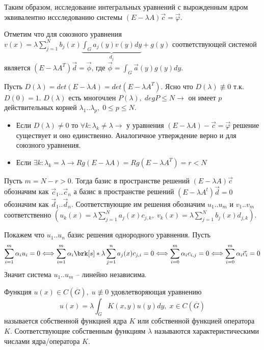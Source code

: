 Таким образом, исследование интегральных уравнений с вырожденным ядром эквивалентно иссследованию системы $(E -\lambda A)\vec{c} = \vec{\varphi}$.

\begin{offtop}
Отметим что для союзного уравнения $v(x) = \lambda \sum_{j = 1}^{N}b_{j}(x)\underbrace{\int_{G}a_{j}(y)v(y)dy}_{d_{j}} + g(y)$ соответствующей системой является $(E - \lambda A^{T})\vec{d}=\vec{\phi}$, где $\vec{\phi}=\int_{G}\vec{a}(y)g(y)dy$.
\end{offtop}

Пусть $D(\lambda) = det(E - \lambda A) = det(E - \lambda A^{T})$. Ясно что $D(\lambda) \not\equiv 0$ т.к. $D(0) = 1$. $D(\lambda)$ есть многочлен $P(\lambda), \; degP \leq N \longrightarrow$ он имеет $p$ действительных корней $\lambda_{1}..\lambda_{p},\; 0 \leq p \leq N$.
\begin{itemize}
  \item Если $D(\lambda) \neq 0$ то $\forall k: \lambda_{k} \neq \lambda \longrightarrow$ у уравнения $(E - \lambda A)-\vec{c} = \vec{\varphi}$ решение существует и оно единственно. Аналогичное утверждение верно и для союзного уравнения.
  \item Если $\exists k: \lambda_{k} = \lambda \rightarrow Rg(E - \lambda A) = Rg(E - \lambda A^{T}) = r < N$
\end{itemize}

Пусть $m = N - r > 0$. Тогда базис в пространстве решений $(E - \lambda A)\vec{c}$ обозначим как $\vec{c}_{1}..\vec{c}_{n}$ а базис в пространстве решений $(E - \lambda A^{t})\vec{d}=0$ обозначим как $\vec{d}_{1}..\vec{d}_{n}$. Соответствующие им решения обозначим $u_{1}..u_{m}$ и $v_{1}..v_{m}$ соответственно $(u_{k}(x) = \lambda \sum_{j = 1}^{N}a_{j}(x)c_{j,k}, \; v_{k}(x) = \lambda \sum_{j = 1}^{N}b_{j}(x)d_{j,k})$.

Покажем что $u_{1}..u_{n}$ базис решения однородного уравнения. Пусть
$$\sum_{i=1}^{m}\alpha_{i}u_{i} = 0 \Longleftrightarrow \sum_{i=1}^{m}\alpha_{i}\brk[s]*{\lambda\sum_{j=1}^{n}a_{j}(x)c_{j,i}} = 0 \Longleftrightarrow \sum_{i=0}^{m}\alpha_{i}c_{i,j} = 0 \Longleftrightarrow \sum_{i=0}^{m}\alpha_{i}\vec{c}_{i} = 0$$
Значит система $u_{1}..u_{m}$ -- линейно независима.

\begin{definition}
Функция $u(x) \in C(\overline{G}), \; u \not\equiv 0$ удовлетворяющая уравнению
$$u(x) = \lambda \int_{G}K(x,y)u(y)dy, \; x \in C(\overline{G})$$
называется собственной функцией ядра $K$ или собственной функцией оператора $K$. Соответствующие собственным функциям $\lambda$ называются характеристическими числами ядра/оператора $K$.
\end{definition}

